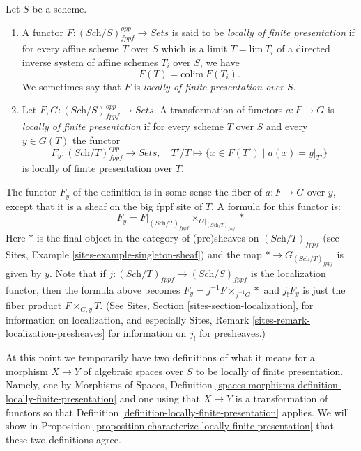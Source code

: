 \begin{definition}
\label{definition-locally-finite-presentation}
Let $S$ be a scheme.
\begin{enumerate}
\item A functor $F : (\textit{Sch}/S)_{fppf}^{opp} \to \textit{Sets}$
is said to be {\it locally of finite presentation} if 
for every affine scheme $T$ over $S$ which is a limit $T = \text{lim}\ T_i$
of a directed inverse system of affine schemes $T_i$ over $S$, we have
$$
F(T) = \text{colim}\ F(T_i).
$$
We sometimes say that $F$ is {\it locally of finite presentation over $S$}.
\item Let $F, G : (\textit{Sch}/S)_{fppf}^{opp} \to \textit{Sets}$.
A transformation of functors $a : F \to G$
is {\it locally of finite presentation} if for every scheme $T$ over $S$
and every $y \in G(T)$ the functor
$$
F_y : (\textit{Sch}/T)_{fppf}^{opp} \longrightarrow \textit{Sets}, \quad
T'/T \longmapsto \{x \in F(T') \mid a(x) = y|_{T'}\}
$$
is locally of finite presentation over $T$.
\end{enumerate}
\end{definition}

\noindent
The functor $F_y$ of the definition is in some sense the fiber of
$a : F \to G$ over $y$, except that it is a sheaf on the big fppf
site of $T$. A formula for this functor is:
\begin{equation}
\label{equation-fibre-map-functors}
F_y =
F|_{(\textit{Sch}/T)_{fppf}}
{\times}_{G|_{(\textit{Sch}/T)_{fppf}}}
*
\end{equation}
Here $*$ is the final object in the category of (pre)sheaves
on $(\textit{Sch}/T)_{fppf}$ (see
Sites, Example \ref{sites-example-singleton-sheaf})
and the map $* \to G_{(\textit{Sch}/T)_{fppf}}$ is given by $y$.
Note that if $j : (\textit{Sch}/T)_{fppf} \to (\textit{Sch}/S)_{fppf}$
is the localization functor, then the formula above becomes
$F_y = j^{-1}F \times_{j^{-1}G} *$ and $j_!F_y$ is just the fiber product
$F \times_{G, y} T$. (See
Sites, Section \ref{sites-section-localization},
for information on localization, and especially
Sites, Remark \ref{sites-remark-localization-presheaves}
for information on $j_!$ for presheaves.)

\medskip\noindent
At this point we temporarily have two definitions of what it means
for a morphism $X \to Y$ of algebraic spaces over $S$ to be locally of finite
presentation. Namely, one by
Morphisms of Spaces,
Definition \ref{spaces-morphisms-definition-locally-finite-presentation}
and one using that $X \to Y$ is a transformation of functors so that
Definition \ref{definition-locally-finite-presentation}
applies. We will show in
Proposition \ref{proposition-characterize-locally-finite-presentation}
that these two definitions agree.

